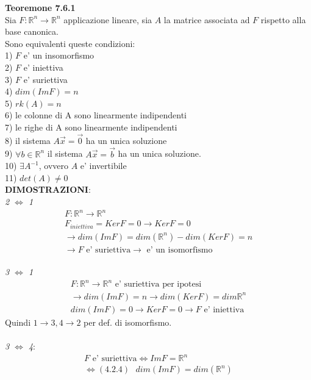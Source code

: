 \documentclass{article}
\begin{document}
\textbf{Teoremone 7.6.1}
\\Sia $F: \mathbb{R}^n \to \mathbb{R}^n$ applicazione lineare, sia $A$ la matrice associata ad $F$ rispetto alla base canonica.
\vspace{3px}
\\Sono equivalenti queste condizioni:
\\1) $F$ e' un insomorfismo
\\2) $F$ e' iniettiva
\\3) $F$ e' suriettiva
\\4) $dim(Im F)=n$
\\5) $rk(A)=n$
\\6) le colonne di A sono linearmente indipendenti
\\7) le righe di A sono linearmente indipendenti
\\8) il sistema $A\vec{x}=\vec{0}$ ha un unica soluzione
\\9) $\forall b \in \mathbb{R}^n$ il sistema $A\vec{x}=\vec{b}$ ha un unica soluzione.
\\10) $\exists A^{-1}$, ovvero $A$ e' invertibile
\\11) $det(A) \neq 0$ 
\vspace{1em}
\\\textbf{DIMOSTRAZIONI}:
\\\textit{2 $\iff$ 1}
\begin{align*}
    F : \mathbb{R}^n \to \mathbb{R}^n \\
    F_{iniettiva}=Ker F = {0}  \to Ker F =0
    \\ \to dim(Im F)=dim(\mathbb{R}^n)-dim(Ker F)=n
    \\ \to F \text{ e' suriettiva} \to \text{ e' un isomorfismo}
\end{align*}
\\\textit{3 $\iff $ 1}
\begin{align*}
    F : \mathbb{R}^n \to \mathbb{R}^n \text{ e' suriettiva per ipotesi}\\
    \to dim(Im F)=n \to dim(Ker F)=dim \mathbb{R}^n
    \\ dim(Im F)=0 \to Ker F = {0} \to F \text{ e' iniettiva}
\end{align*}
Quindi $1 \to 3, 4 \to 2$ per def. di isomorfismo. \\
\\ \textit{3 $\iff$ 4}:
\begin{align*}
    F \text{ e' suriettiva} \iff Im F = \mathbb{R}^n
    \\ \iff (4.2.4) \text{  }dim(Im F)=dim(\mathbb{R}^n)
\end{align*}
\end{document}
